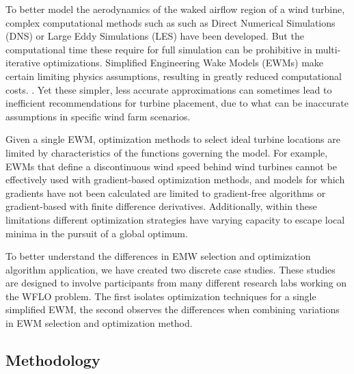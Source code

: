 \documentclass[]{aiaa-tc}
\begin{document}
To better model the aerodynamics of the waked airflow region of a wind turbine, complex computational methods such as such as Direct Numerical Simulations (DNS) or Large Eddy Simulations (LES) have been developed. But the computational time these require for full simulation can be prohibitive in multi-iterative optimizations. Simplified Engineering Wake Models (EWMs) make certain limiting physics assumptions, resulting in greatly reduced computational costs. \cite{HerbertAcero2014}. Yet these simpler, less accurate approximations can sometimes lead to inefficient recommendations for turbine placement, due to what can be inaccurate assumptions in specific wind farm scenarios. %

Given a single EWM, optimization methods to select ideal turbine locations are limited by characteristics of the functions governing the model.
%
For example, EWMs that define a discontinuous wind speed behind wind turbines cannot be effectively used with gradient-based optimization methods, and models for which gradients have not been calculated are limited to gradient-free algorithms or gradient-based with finite difference derivatives.
%
%
Additionally, within these limitations different optimization strategies have varying capacity to escape local minima in the pursuit of a global optimum. %


To better understand the differences in EMW selection and optimization algorithm application, we have created two discrete case studies.
These studies are designed to involve participants from many different research labs working on the WFLO problem.
The first isolates optimization techniques for a single simplified EWM, the second observes the differences when combining variations in EWM selection and optimization method.



\begin{centering}
	\bigskip
	\section{Methodology}
\end{centering}
\end{document}
